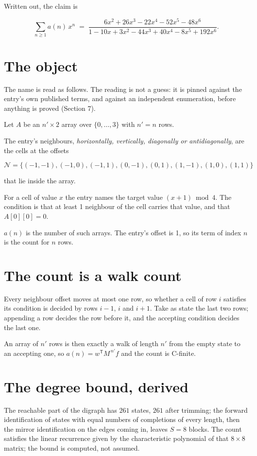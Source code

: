 \documentclass[11pt]{article}
\theoremstyle{definition}
\begin{document}
Written out, the claim is

\[\sum_{n \ge 1} a(n)\,x^n \;=\; \frac{6x^{2} + 26x^{3} - 22x^{4} - 52x^{5} - 48x^{6}}{1 - 10x + 3x^{2} - 44x^{3} + 40x^{4} - 8x^{5} + 192x^{6}}.\]

\section{The object}

The name is read as follows. The reading is not a guess: it is pinned against the entry's own published terms, and against an independent enumeration, before anything is proved (Section 7).

Let $A$ be an $n' \times 2$ array over $\{0,\dots,3\}$ with $n' = n$ rows.

The entry's neighbours, {\itshape horizontally, vertically, diagonally or antidiagonally}, are the cells at the offsets

\[\mathcal{N} = \{(-1,-1), (-1,0), (-1,1), (0,-1), (0,1), (1,-1), (1,0), (1,1)\}\]

that lie inside the array.

For a cell of value $x$ the entry names the target value $(x + 1) \bmod 4$. The condition is that at least 1 neighbour of the cell carries that value, and that $A[0][0] = 0$.

$a(n)$ is the number of such arrays. The entry's offset is 1, so its term of index $n$ is the count for $n$ rows.

\section{The count is a walk count}

Every neighbour offset moves at most one row, so whether a cell of row $i$ satisfies its condition is decided by rows $i-1$, $i$ and $i+1$. Take as state the last two rows; appending a row decides the row before it, and the accepting condition decides the last one.

An array of $n'$ rows is then exactly a walk of length $n'$ from the empty state to an accepting one, so $a(n) = w^{\mathsf T}M^{\,n'}f$ and the count is C-finite.

\section{The degree bound, derived}

The reachable part of the digraph has $261$ states, $261$ after trimming; the forward identification of states with equal numbers of completions of every length, then the mirror identification on the edges coming in, leaves $S = 8$ blocks. The count satisfies the linear recurrence given by the characteristic polynomial of that $8\times8$ matrix; the bound is computed, not assumed.
\end{document}
